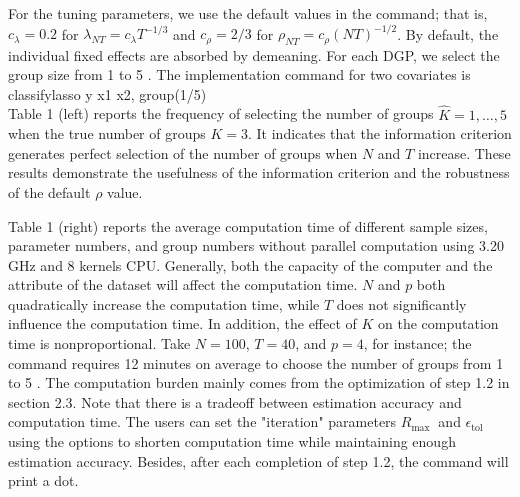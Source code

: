\documentclass[10pt]{article}
\begin{document}
For the tuning parameters, we use the default values in the command; that is, $c_{\lambda}=0.2$ for $\lambda_{N T}=c_{\lambda} T^{-1 / 3}$ and $c_{\rho}=2 / 3$ for $\rho_{N T}=c_{\rho}(N T)^{-1 / 2}$. By default, the individual fixed effects are absorbed by demeaning. For each DGP, we select the group size from 1 to 5 . The implementation command for two covariates is\\
classifylasso y x1 x2, group(1/5)\\
Table 1 (left) reports the frequency of selecting the number of groups $\widehat{K}=1, \ldots, 5$ when the true number of groups $K=3$. It indicates that the information criterion generates perfect selection of the number of groups when $N$ and $T$ increase. These results demonstrate the usefulness of the information criterion and the robustness of the default $\rho$ value.

Table 1 (right) reports the average computation time of different sample sizes, parameter numbers, and group numbers without parallel computation using 3.20 GHz and 8 kernels CPU. Generally, both the capacity of the computer and the attribute of the dataset will affect the computation time. $N$ and $p$ both quadratically increase the computation time, while $T$ does not significantly influence the computation time. In addition, the effect of $K$ on the computation time is nonproportional. Take $N=100$, $T=40$, and $p=4$, for instance; the command requires 12 minutes on average to choose the number of groups from 1 to 5 . The computation burden mainly comes from the optimization of step 1.2 in section 2.3. Note that there is a tradeoff between estimation accuracy and computation time. The users can set the "iteration" parameters $R_{\text {max }}$ and $\epsilon_{\text {tol }}$ using the options to shorten computation time while maintaining enough estimation accuracy. Besides, after each completion of step 1.2, the command will print a dot.
\end{document}
